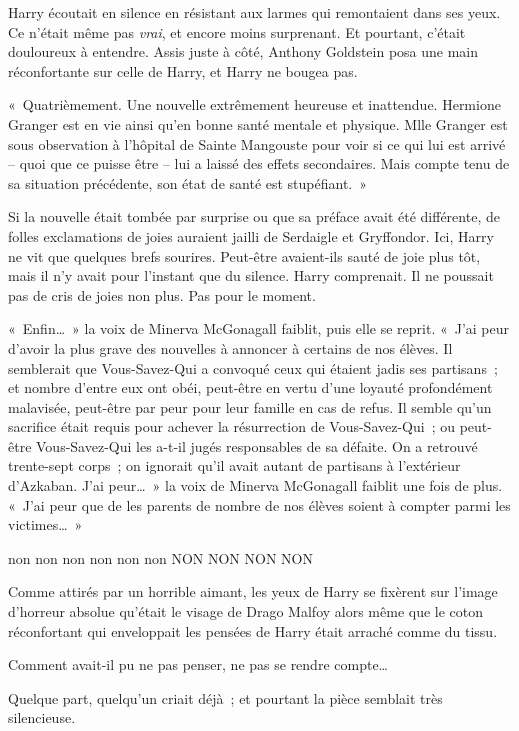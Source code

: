 Harry écoutait en silence en résistant aux larmes qui remontaient dans ses yeux.
Ce n'était même pas \emph{vrai}, et encore moins surprenant.
Et pourtant, c'était douloureux à entendre.
Assis juste à côté, Anthony Goldstein posa une main réconfortante sur celle de Harry, et Harry ne bougea pas.

«~Quatrièmement.
Une nouvelle extrêmement heureuse et inattendue.
Hermione Granger est en vie ainsi qu'en bonne santé mentale et physique.
Mlle Granger est sous observation à l'hôpital de Sainte Mangouste pour voir si ce qui lui est arrivé -- quoi que ce puisse être -- lui a laissé des effets secondaires.
Mais compte tenu de sa situation précédente, son état de santé est stupéfiant.~»

Si la nouvelle était tombée par surprise ou que sa préface avait été différente, de folles exclamations de joies auraient jailli de Serdaigle et Gryffondor.
Ici, Harry ne vit que quelques brefs sourires.
Peut-être avaient-ils sauté de joie plus tôt, mais il n'y avait pour l'instant que du silence.
Harry comprenait.
Il ne poussait pas de cris de joies non plus.
Pas pour le moment.

«~Enfin…~»
la voix de Minerva McGonagall faiblit, puis elle se reprit.
«~J'ai peur d'avoir la plus grave des nouvelles à annoncer à certains de nos élèves.
Il semblerait que Vous-Savez-Qui a convoqué ceux qui étaient jadis ses partisans~; et nombre d'entre eux ont obéi, peut-être en vertu d'une loyauté profondément malavisée, peut-être par peur pour leur famille en cas de refus.
Il semble qu'un sacrifice était requis pour achever la résurrection de Vous-Savez-Qui~; ou peut-être Vous-Savez-Qui les a-t-il jugés responsables de sa défaite.
On a retrouvé trente-sept corps~; on ignorait qu'il avait autant de partisans à l'extérieur d'Azkaban.
J'ai peur…~»
la voix de Minerva McGonagall faiblit une fois de plus.
«~J'ai peur que de les parents de nombre de nos élèves soient à compter parmi les victimes…~»

non non non non non non NON NON NON NON

Comme attirés par un horrible aimant, les yeux de Harry se fixèrent sur l'image d'horreur absolue qu'était le visage de Drago Malfoy alors même que le coton réconfortant qui enveloppait les pensées de Harry était arraché comme du tissu.

Comment avait-il pu ne pas penser, ne pas se rendre compte…

Quelque part, quelqu'un criait déjà~; et pourtant la pièce semblait très silencieuse.

